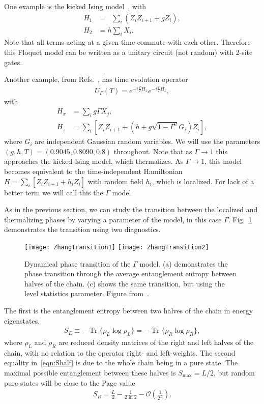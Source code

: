 \documentclass[a4paper,12pt]{article}
\renewcommand{\th}[1]{\frac{1}{#1}}
\newcommand{\nn}{\nonumber\\}
\DeclareMathOperator{\Tr}{Tr}
\begin{document}
One example is the kicked Ising model~\cite{vonKeyserlingkHydro}, with 
\begin{align}
H_1 &= \phantom{h}\sum_i\left(Z_iZ_{i+1}+gZ_i\right),\nn
H_2 &= h\sum_iX_i. \label{eqn:kicked}
\end{align}
Note that all terms acting at a given time commute with each other. Therefore this Floquet model can be written as a unitary circuit (not random) with 2-site gates. 

Another example, from Refs.~\cite{ZhangFloq, ChenOtoc}, has time evolution operator 
\begin{align}
U_F(T) = e^{-i\frac{T}{2}H_x}e^{-i\frac{T}{2}H_z},
\end{align}
with
\begin{align}
H_x &= \sum_i g\Gamma X_j,\nn
H_z &= \sum_i \left[Z_iZ_{i+1} + (h+g\sqrt{1-\Gamma^2}G_i)Z_i\right],
\end{align}
where $G_i$ are independent Gaussian random variables. We will use the parameters $(g,h,T) = (0.9045,0.8090,0.8)$ throughout.
Note that as $\Gamma\to1$ this approaches the kicked Ising model, which thermalizes. As $\Gamma\to1$, this model becomes equivalent to the time-independent Hamiltonian $H=\sum_i\left[Z_iZ_{i+1} + h_iZ_i\right]$ with random field $h_i$, which is localized. For lack of a better term we will call this the $\Gamma$ model.

As in the previous section, we can study the transition between the localized and thermalizing phases by varying a parameter of the model, in this case $\Gamma$. Fig.~\ref{fig:floqtrans} demonstrates the transition using two diagnostics. 
\begin{figure}
	\centering
	\texttt{[image: ZhangTransition1]}
	\texttt{[image: ZhangTransition2]}
	\caption{Dynamical phase transition of the $\Gamma$ model. (a) demonstrates the phase transition through the average entanglement entropy between halves of the chain. (c) shows the same transition, but using the level statistics parameter. Figure from~\cite{ZhangFloq}.}
	\label{fig:floqtrans}
\end{figure}
The first is the entanglement entropy between two halves of the chain in energy eigenstates, 
\begin{align}
S_E \equiv -\Tr\{\rho_L\log\rho_L\} = -\Tr\{\rho_R\log\rho_R\},\label{eqn:Shalf}
\end{align}
where $\rho_L$ and $\rho_R$ are reduced density matrices of the right and left halves of the chain, with no relation to the operator right- and left-weights. The second equality in~\ref{eqn:Shalf} is due to the whole chain being in a pure state. The maximal possible entanglement between these halves is $S_\text{max}=L/2$, but random pure states will be close to the Page value~\cite{Page, ZhangTherm}
\begin{align}
S_R = \frac{L}{2} - \th{2\ln 2} -\mathcal{O}\left(\th{2^L}\right).
\end{align}
\end{document}
